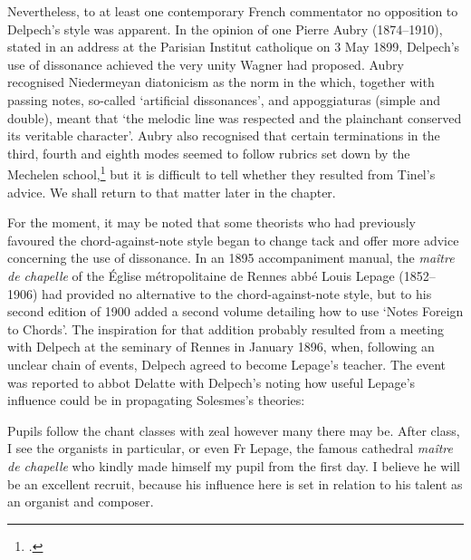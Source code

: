Nevertheless, to at least one contemporary French commentator no opposition to Delpech's style was apparent.
In the opinion of one Pierre Aubry (1874--1910), stated in an address at the Parisian Institut catholique on 3 May 1899, Delpech's use of dissonance achieved the very unity Wagner had proposed.
Aubry recognised Niedermeyan diatonicism as the norm in the \ldo{} which, together with passing notes, so-called `artificial dissonances', and appoggiaturas (simple and double), meant that `the melodic line was respected and the plainchant conserved its veritable character'.
Aubry also recognised that certain terminations in the third, fourth and eighth modes seemed to follow rubrics set down by the Mechelen school,\footcite[98]{AubryOEuvrebenedictine1900} but it is difficult to tell whether they resulted from Tinel's advice.
We shall return to that matter later in the chapter.

For the moment, it may be noted that some theorists who had previously favoured the chord-against-note style began to change tack and offer more advice concerning the use of dissonance.
%
In an 1895 accompaniment manual, the \emph{maître de chapelle} of the Église métropolitaine de Rennes abbé Louis Lepage (1852--1906) had provided no alternative to the chord-against-note style, but to his second edition of 1900 added a second volume detailing how to use `Notes Foreign to Chords'.
The inspiration for that addition probably resulted from a meeting with Delpech at the seminary of Rennes in January 1896, when, following an unclear chain of events, Delpech agreed to become Lepage's teacher.
The event was reported to abbot Delatte with Delpech's noting how useful Lepage's influence could be in propagating Solesmes's theories:
\noclub[2]

  {}
{Pupils follow the chant classes with zeal however many there may be. After class, I see the organists in particular, or even Fr Lepage, the famous cathedral \emph{maître de chapelle} who kindly made himself my pupil from the first day. I believe he will be an excellent recruit, because his influence here is set in relation to his talent as an organist and composer.}


